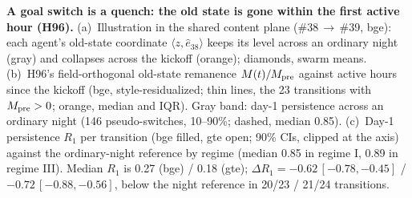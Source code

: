 \caption{\textbf{A goal switch is a quench: the old state is gone within the first active hour (H96).}
(a)~Illustration in the shared content plane (\#38\,$\rightarrow$\,\#39, bge): each agent's old-state coordinate $\langle z,\hat e_{38}\rangle$ keeps its level across an ordinary night (gray) and collapses across the kickoff (orange); diamonds, swarm means.
(b)~H96's field-orthogonal old-state remanence $M(t)/M_{\rm pre}$ against active hours since the kickoff (bge, style-residualized; thin lines, the 23 transitions with $M_{\rm pre}>0$; orange, median and IQR). Gray band: day-1 persistence across an ordinary night (146 pseudo-switches, 10--90\%; dashed, median 0.85).
(c)~Day-1 persistence $R_1$ per transition (bge filled, gte open; 90\% CIs, clipped at the axis) against the ordinary-night reference by regime (median 0.85 in regime I, 0.89 in regime III). Median $R_1$ is 0.27 (bge) / 0.18 (gte); $\Delta R_1=-0.62\,[-0.78,-0.45]$ / $-0.72\,[-0.88,-0.56]$, below the night reference in 20/23 / 21/24 transitions.}
\label{fig:H96}
